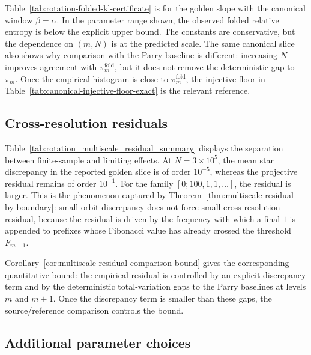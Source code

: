 

Table~\ref{tab:rotation-folded-kl-certificate} is for the golden slope with
the canonical window \(\beta=\alpha\).  In the parameter range shown, the
observed folded relative entropy is below the explicit upper bound.  The
constants are conservative, but the dependence on \((m,N)\) is at the
predicted scale.  The same canonical slice also shows why comparison with the
Parry baseline is different: increasing \(N\) improves agreement with
\(\pi_m^{\mathrm{fold}}\), but it does not remove the deterministic gap to
\(\pi_m\).  Once the empirical histogram is close to
\(\pi_m^{\mathrm{fold}}\), the injective floor in
Table~\ref{tab:canonical-injective-floor-exact} is the relevant reference.

\subsection{Cross-resolution residuals}



Table~\ref{tab:rotation_multiscale_residual_summary} displays the separation
between finite-sample and limiting effects.  At \(N=3\times 10^5\), the mean
star discrepancy in the reported golden slice is of order \(10^{-5}\), whereas
the projective residual remains of order \(10^{-1}\).  For the family
\([0;100,1,1,\dots]\), the residual is larger.  This is the phenomenon
captured by
Theorem~\ref{thm:multiscale-residual-by-boundary}: small orbit discrepancy
does not force small cross-resolution residual, because the residual is driven
by the frequency with which a final \(1\) is appended to prefixes whose
Fibonacci value has already crossed the threshold \(F_{m+1}\).

Corollary~\ref{cor:multiscale-residual-comparison-bound} gives the corresponding
quantitative bound: the empirical residual is controlled by an explicit
discrepancy term and by the deterministic total-variation gaps to the Parry
baselines at levels \(m\) and \(m+1\).  Once the discrepancy term is smaller
than these gaps, the source/reference comparison controls the bound.

\subsection{Additional parameter choices}



